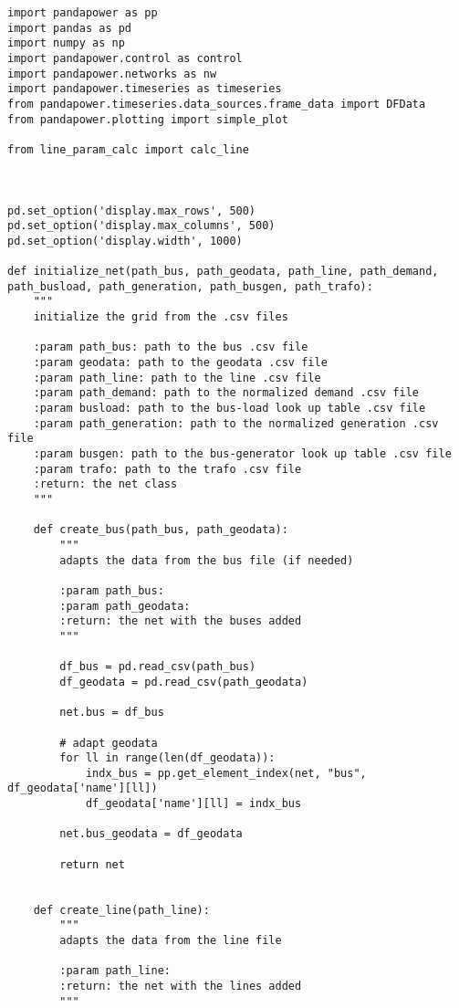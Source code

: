 \begin{lstlisting}[caption={Main code in Python with the Pandapower library}]
import pandapower as pp
import pandas as pd
import numpy as np
import pandapower.control as control
import pandapower.networks as nw
import pandapower.timeseries as timeseries
from pandapower.timeseries.data_sources.frame_data import DFData
from pandapower.plotting import simple_plot

from line_param_calc import calc_line



pd.set_option('display.max_rows', 500)
pd.set_option('display.max_columns', 500)
pd.set_option('display.width', 1000)

def initialize_net(path_bus, path_geodata, path_line, path_demand, path_busload, path_generation, path_busgen, path_trafo):
    """
    initialize the grid from the .csv files

    :param path_bus: path to the bus .csv file
    :param geodata: path to the geodata .csv file
    :param path_line: path to the line .csv file
    :param path_demand: path to the normalized demand .csv file
    :param busload: path to the bus-load look up table .csv file
    :param path_generation: path to the normalized generation .csv file
    :param busgen: path to the bus-generator look up table .csv file
    :param trafo: path to the trafo .csv file
    :return: the net class
    """

    def create_bus(path_bus, path_geodata):
        """
        adapts the data from the bus file (if needed)

        :param path_bus:
        :param path_geodata:
        :return: the net with the buses added
        """

        df_bus = pd.read_csv(path_bus)
        df_geodata = pd.read_csv(path_geodata)

        net.bus = df_bus

        # adapt geodata
        for ll in range(len(df_geodata)):
            indx_bus = pp.get_element_index(net, "bus", df_geodata['name'][ll])
            df_geodata['name'][ll] = indx_bus

        net.bus_geodata = df_geodata

        return net


    def create_line(path_line):
        """
        adapts the data from the line file

        :param path_line:
        :return: the net with the lines added
        """


\end{lstlisting}
